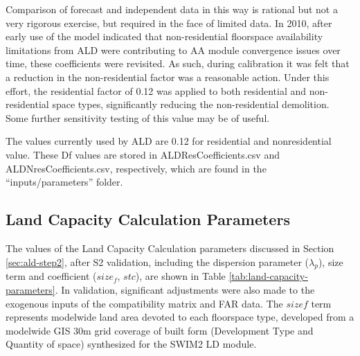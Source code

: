 Comparison of forecast and independent data in this way is rational but not a very rigorous exercise, but required in the face of limited data. In 2010, after early use of the model indicated that non-residential floorspace availability limitations from ALD were contributing to AA module convergence issues over time, these coefficients were revisited. As such, during calibration it was felt that a reduction in the non-residential factor was a reasonable action. Under this effort, the residential factor of 0.12 was applied to both residential and non-residential space types, significantly reducing the non-residential demolition. Some further sensitivity testing of this value may be of useful.

The values currently used by ALD are 0.12 for residential and nonresidential value. These Df values are stored in ALDResCoefficients.csv and ALDNresCoefficients.csv, respectively, which are found in the ``inputs/parameters'' folder.


\subsection{Land Capacity Calculation Parameters}\label{sec:ald-capacity-parameters}  %
The values of the Land Capacity Calculation parameters discussed in Section \ref{sec:ald-step2}, after S2 validation, including the dispersion parameter ($\lambda_p$), size term and coefficient ($size_f$, $stc$), are shown in Table \ref{tab:land-capacity-parameters}. In validation, significant adjustments were also made to the exogenous inputs of the compatibility matrix and FAR data. The $sizef$ term represents modelwide land area devoted to each floorspace type, developed from a modelwide GIS 30m grid coverage of built form (Development Type and Quantity of space) synthesized for the SWIM2 LD module.

